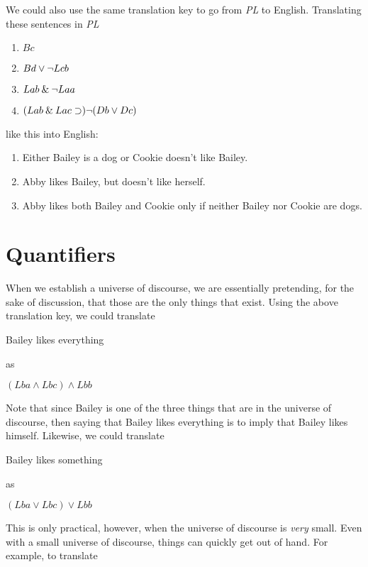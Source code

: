 \documentclass[../logic-text.tex]{subfiles}
\begin{document}
We could also use the same translation key to go from \emph{PL} to English. Translating these sentences in \emph{PL} 

\begin{enumerate}
  \item \(Bc\)
  \item \(Bd \lor \neg  Lcb\)
  \item \(Lab \mathbin{\&} \neg Laa\)
  \item \((Lab \mathbin{\&} Lac \supset) \neg (Db \lor Dc)\)
\end{enumerate}

\noindent like this into English:

\begin{enumerate}
  \item Either Bailey is a dog or Cookie doesn't like Bailey.
  \item Abby likes Bailey, but doesn't like herself.
  \item Abby likes both Bailey and Cookie only if neither Bailey nor Cookie are dogs.
\end{enumerate}

\section{Quantifiers}
\label{sec:quantifiers}

When we establish a universe of discourse, we are essentially pretending, for the sake of discussion, that those are the only things that exist.
Using the above translation key, we could translate

\medskip

Bailey likes everything

\noindent as

\((Lba \land Lbc) \land Lbb\)

\medskip

Note that since Bailey is one of the three things that are in the universe of discourse, then saying that Bailey likes everything is to imply that Bailey likes himself.
Likewise, we could translate

\medskip

Bailey likes something

\noindent as

\((Lba \lor Lbc) \lor Lbb\)

\medskip

This is only practical, however, when the universe of discourse is {\em very} small.
Even with a small universe of discourse, things can quickly get out of hand. For example, to translate
\end{document}
